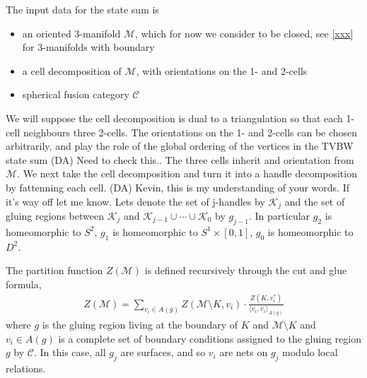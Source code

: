 \documentclass[12pt,a4paper]{article}
\newcommand{\mcc}{\mathcal{C}}
\newcommand{\mck}{\mathcal{K}}
\newcommand{\mcm}{\mathcal{M}}
\newcommand{\dave}[1]{{\color{ao(english)}\footnotesize{(DA) #1}}}
\begin{document}
The input data for the state sum is
\begin{itemize}
\item an oriented 3-manifold $\mcm$, which for now we consider to be closed, see \ref{xxx} for 3-manifolds with boundary
\item a cell decomposition of $\mcm$, with orientations on the 1- and 2-cells
\item spherical fusion category $\mcc$ 
\end{itemize}
We will suppose the cell decomposition is dual to a triangulation so that each 1-cell neighbours three 2-cells.
The orientations on the 1- and 2-cells can be chosen arbitrarily, 
and play the role of the global ordering of the vertices in the TVBW state sum \dave{Need to check this.}. 
The three cells inherit and orientation from $\mcm$.
We next take the cell decomposition and turn it into a handle decomposition by fattenning each cell.
\dave{Kevin, this is my understanding of your words.
If it's way off let me know.}
Lets denote the set of j-handles by $\mck_j$ and the set of gluing regions between $\mck_j$ and $\mck_{j-1} \cup \cdots \cup \mck_{0}$ by $g_{j-1}$. 
In particular $g_2$ is homeomorphic to $S^2$, 
$g_1$ is homeomorphic to $S^1 \times [0,1]$,
$g_0$ is homeomorphic to $D^2$.

The partition function $Z(\mcm)$ is defined recursively through the cut and glue formula,
\begin{align}
Z(\mcm) = \sum_{v_i \in A(g)} Z(\mcm \setminus K, v_i) \cdot \frac{Z(K, v_i^*) }{\langle v_i, v_i \rangle_{A(g)}}
\end{align}
where $g$ is the gluing region living at the boundary of $K$ and $\mcm \setminus K$ and $v_i \in A(g)$  is a complete set of boundary conditions assigned to the gluing region $g$ by $\mcc$.
In this case, all $g_j$ are surfaces, and so $v_i$ are nets on $g_j$ modulo local relations.
\end{document}
